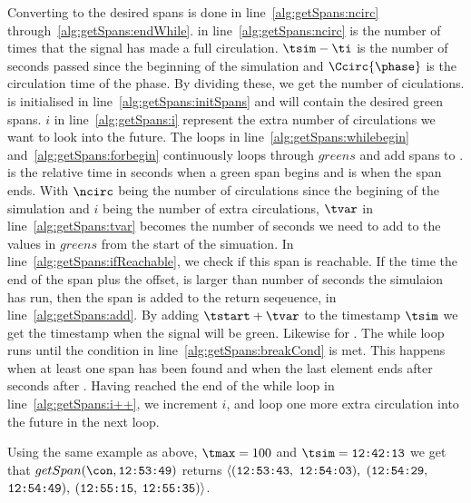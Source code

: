 Converting \greens to the desired spans is done in line~\ref{alg:getSpans:ncirc} through~\ref{alg:getSpans:endWhile}.
\ncirc in line~\ref{alg:getSpans:ncirc} is the number of times that the signal has made a full circulation.
$\tsim-\ti$ is the number of seconds passed since the beginning of the simulation and $\Ccirc{\phase}$ is the circulation time of the phase. 
By dividing these, we get the number of ciculations.
\spans is initialised in line~\ref{alg:getSpans:initSpans} and will contain the desired green spans.
$i$ in line~\ref{alg:getSpans:i} represent the extra number of circulations we want to look into the future.
The loops in line~\ref{alg:getSpans:whilebegin} and~\ref{alg:getSpans:forbegin} continuously loops through $greens$ and add spans to \spans.
\tstart is the relative time in seconds when a green span begins and \tend is when the span ends. %
With $\ncirc$ being the number of circulations since the begining of the simulation and $i$ being the number of extra circulations, $\tvar$ in line~\ref{alg:getSpans:tvar} becomes the number of seconds we need to add to the values in $greens$ from the start of the simuation.
In line~\ref{alg:getSpans:ifReachable}, we check if this span is reachable.
If the time the end of the span plus the offset, \tvar is larger than number of seconds the simulaion has run, then the span is added to the return seqeuence, \spans in line~\ref{alg:getSpans:add}.
By adding $\tstart + \tvar$ to the timestamp $\tsim$ we get the timestamp when the signal will be green. Likewise for \tend.
The while loop runs until the condition in line~\ref{alg:getSpans:breakCond} is met.
This happens when at least one span has been found and when the last element ends after \tmax seconds after \ti.
Having reached the end of the while loop in line~\ref{alg:getSpans:i++}, we increment $i$, and loop one more extra circulation into the future in the next loop.

Using the same example as above, $\tmax=100$ and $\tsim=\verb#12:42:13#$ we get that $getSpan(\con, \verb#12:53:49#)$ returns $\langle(\verb#12:53:43#,$ $\verb#12:54:03#),$ $(\verb#12:54:29#,$ $\verb#12:54:49#),$ $(\verb#12:55:15#,$ $\verb#12:55:35#)\rangle$.

